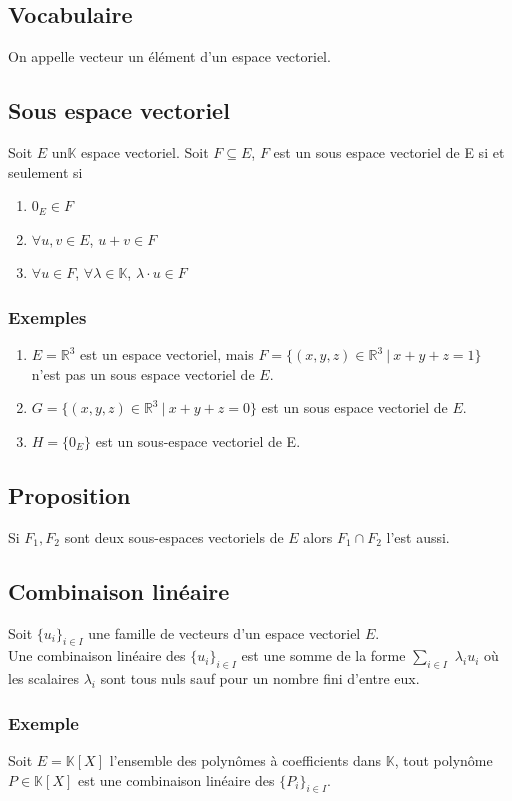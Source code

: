 \documentclass[a4paper,10pt]{book} %
\newcommand{\R}{\mathbb{R}}
\newcommand{\K}{\mathbb{K}}
\newcommand{\sevs}{sous-espaces vectoriels }
\newcommand{\sev}{sous-espace vectoriel }
\newcommand{\tq}{~|~}
\begin{document}
\subsection{Vocabulaire}
On appelle vecteur un élément d'un espace vectoriel.

\subsection{Sous espace vectoriel}
Soit $E$ un$\K$ espace vectoriel. Soit $F\subseteq E$, $F$ est un sous espace vectoriel de E si et seulement si \begin{enumerate}
\item $0_E\in F$
\item $\forall u,v\in E$, $u+v\in F$
\item $\forall u\in F$, $\forall \lambda\in \K$, $\lambda \cdot u\in F$
\end{enumerate}

\subsubsection{Exemples}
\begin{enumerate}
\item $E=\R^3$ est un espace vectoriel, mais $F=\{(x,y,z)\in\R^3 \tq x+y+z=1 \}$ n'est pas un sous espace vectoriel de $E$.
\item $G=\{(x,y,z)\in\R^3 \tq x+y+z=0 \}$ est un sous espace vectoriel de $E$.
\item $H=\{0_E\}$ est un \sev de E.
\end{enumerate}

\subsection{Proposition}
Si $F_1,F_2$ sont deux \sevs de $E$ alors $F_1\cap F_2$ l'est aussi.

\subsection{Combinaison linéaire}
Soit $\{u_i\}_{i\in I}$ une famille de vecteurs d'un espace vectoriel $E$.\\
Une combinaison linéaire des $\{u_i\}_{i\in I}$ est une somme de la forme $\sum_{i\in I}$ $\lambda_i u_i$ où les scalaires $\lambda_i$ sont tous nuls sauf pour un nombre fini d'entre eux.

\subsubsection{Exemple}
Soit $E=\K[X]$ l'ensemble des polynômes à coefficients dans $\K$, tout polynôme $P\in \K[X]$ est une combinaison linéaire des $\{P_i\}_{i\in I}$.
\end{document}
